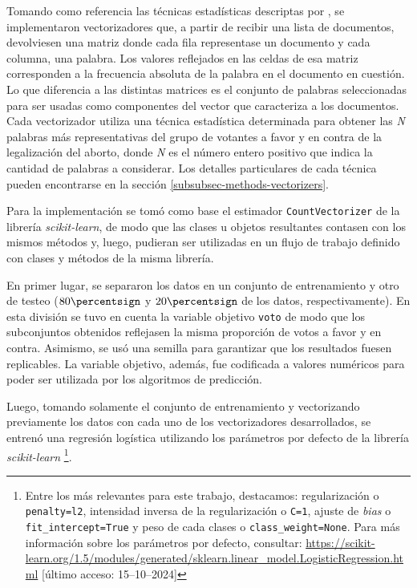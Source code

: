 Tomando como referencia las t\'ecnicas estad\'isticas descriptas por
\cite{monroe2008fightin}, se implementaron vectorizadores que, a partir de
recibir una lista de documentos, devolviesen una matriz donde cada fila
representase un documento y cada columna, una palabra. Los valores
reflejados en las celdas de esa matriz corresponden a la frecuencia absoluta
de la palabra en el documento en cuesti\'on. Lo que diferencia a
las distintas matrices es el conjunto de palabras seleccionadas
para ser usadas como componentes del vector
que caracteriza a los documentos. Cada vectorizador utiliza
una t\'ecnica estad\'istica determinada para obtener las \textit{N}
palabras m\'as representativas del grupo de votantes a favor y
en contra de la legalizaci\'on del aborto, donde \textit{N} es el n\'umero
entero positivo que indica la cantidad de palabras a considerar.
Los detalles particulares de cada
t\'ecnica pueden encontrarse en la secci\'on \ref{subsubsec-methods-vectorizers}.
\par
Para la implementaci\'on se tom\'o como base el estimador \texttt{CountVectorizer}
de la librer\'ia \textit{scikit-learn}, de modo que las clases u objetos resultantes
contasen con los mismos m\'etodos y, luego, pudieran ser utilizadas en un
flujo de trabajo definido con clases y m\'etodos de la misma librer\'ia.
\par
En primer lugar, se separaron los datos en un conjunto de entrenamiento
y otro de testeo ($80\percentsign$ y $20\percentsign$ de los datos, respectivamente).
En esta divisi\'on se tuvo en cuenta la variable objetivo \texttt{voto} de modo
que los subconjuntos obtenidos reflejasen la misma proporci\'on de votos a favor
y en contra. Asimismo, se us\'o una semilla para garantizar que los resultados
fuesen replicables. La variable objetivo, adem\'as, fue codificada a valores
num\'ericos para poder ser utilizada por los algoritmos de predicci\'on.
\par
Luego, tomando solamente el conjunto de entrenamiento y vectorizando
previamente los datos con cada uno de los vectorizadores desarrollados,
se entren\'o una regresi\'on log\'istica utilizando los par\'ametros por defecto
de la librer\'ia \textit{scikit-learn}
\footnote{Entre los m\'as relevantes para este trabajo, destacamos: regularizaci\'on
o \texttt{penalty=l2}, intensidad inversa de la regularizaci\'on o \texttt{C=1},
ajuste de \textit{bias} o \texttt{fit\_intercept=True} y peso de cada clases
o \texttt{class\_weight=None}.
Para m\'as informaci\'on sobre los par\'ametros por defecto, consultar:
\url{https://scikit-learn.org/1.5/modules/generated/sklearn.linear_model.LogisticRegression.html} [\'ultimo acceso: 15--10--2024]}.
